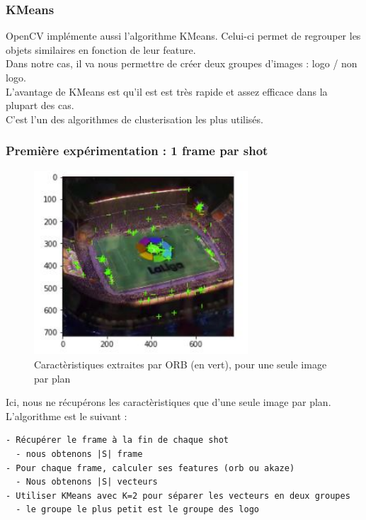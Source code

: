 \documentclass[11pt]{article}
\begin{document}
\subsubsection{KMeans}
\label{sec:org55c520b}
OpenCV implémente aussi l'algorithme KMeans. Celui-ci permet de regrouper les objets similaires en fonction de leur feature.\\
Dans notre cas, il va nous permettre de créer deux groupes d'images : logo / non logo.\\
L'avantage de KMeans est qu'il est est très rapide et assez efficace dans la plupart des cas.\\
C'est l'un des algorithmes de clusterisation les plus utilisés.\\


\subsubsection{Première expérimentation : 1 frame par shot}
\label{sec:orgbb6bf33}
\begin{figure}[htbp]
\centering
\includegraphics[width=8cm]{orb_simple_res.JPG}
\caption{Caractèristiques extraites par ORB (en vert), pour une seule image par plan}
\end{figure}

Ici, nous ne récupérons les caractèristiques que d'une seule image par plan.\\

L'algorithme est le suivant :\\
\begin{verbatim}
- Récupérer le frame à la fin de chaque shot
  - nous obtenons |S| frame
- Pour chaque frame, calculer ses features (orb ou akaze)
  - Nous obtenons |S| vecteurs
- Utiliser KMeans avec K=2 pour séparer les vecteurs en deux groupes
  - le groupe le plus petit est le groupe des logo
\end{verbatim}
\end{document}
